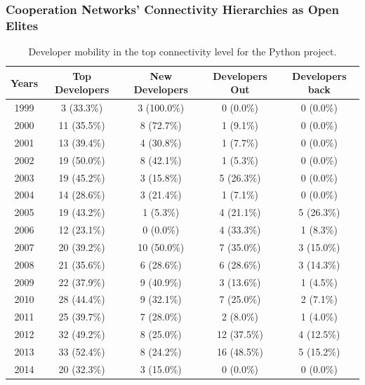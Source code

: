 \documentclass[ignorenonframetext,red,8pt,notes=show]{beamer}
\begin{document}
\begin{frame}
\frametitle{Cooperation Networks' Connectivity Hierarchies as Open Elites}

\begin{table}[h]
\caption{Developer mobility in the top connectivity level for the Python project.}
\label{python_mobility_table}
\begin{center}
\begin{tabular}{ccccc}
\toprule
Years&Top Developers&New Developers&Developers Out&Developers back \\ 
\midrule
1999&3 (33.3\%)&3 (100.0\%)&0 (0.0\%)&0 (0.0\%) \\ 
2000&11 (35.5\%)&8 (72.7\%)&1 (9.1\%)&0 (0.0\%) \\ 
2001&13 (39.4\%)&4 (30.8\%)&1 (7.7\%)&0 (0.0\%) \\ 
2002&19 (50.0\%)&8 (42.1\%)&1 (5.3\%)&0 (0.0\%) \\ 
2003&19 (45.2\%)&3 (15.8\%)&5 (26.3\%)&0 (0.0\%) \\ 
2004&14 (28.6\%)&3 (21.4\%)&1 (7.1\%)&0 (0.0\%) \\ 
2005&19 (43.2\%)&1 (5.3\%)&4 (21.1\%)&5 (26.3\%) \\ 
2006&12 (23.1\%)&0 (0.0\%)&4 (33.3\%)&1 (8.3\%) \\ 
2007&20 (39.2\%)&10 (50.0\%)&7 (35.0\%)&3 (15.0\%) \\ 
2008&21 (35.6\%)&6 (28.6\%)&6 (28.6\%)&3 (14.3\%) \\ 
2009&22 (37.9\%)&9 (40.9\%)&3 (13.6\%)&1 (4.5\%) \\ 
2010&28 (44.4\%)&9 (32.1\%)&7 (25.0\%)&2 (7.1\%) \\ 
2011&25 (39.7\%)&7 (28.0\%)&2 (8.0\%)&1 (4.0\%) \\ 
2012&32 (49.2\%)&8 (25.0\%)&12 (37.5\%)&4 (12.5\%) \\ 
2013&33 (52.4\%)&8 (24.2\%)&16 (48.5\%)&5 (15.2\%) \\ 
2014&20 (32.3\%)&3 (15.0\%)&0 (0.0\%)&0 (0.0\%) \\ 
\bottomrule
\end{tabular}
\end{center}
\end{table}

\end{frame}
\end{document}
